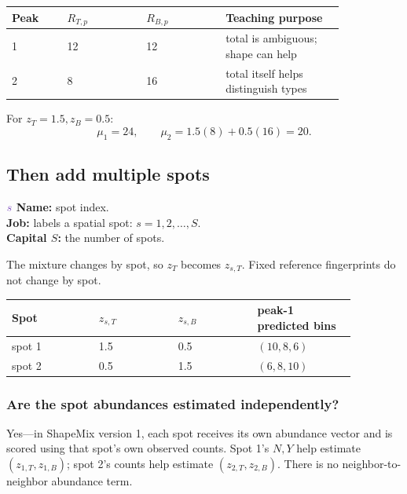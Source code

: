 \documentclass[11pt]{article}
\newcommand{\unknownq}[1]{\textcolor{unknownpurple}{#1}}
\begin{document}
\begin{center}
\begin{tabular}{C{0.14\linewidth}C{0.20\linewidth}C{0.20\linewidth}L{0.30\linewidth}}
\toprule
Peak & \(R_{T,p}\) & \(R_{B,p}\) & Teaching purpose \\
 & 12 & 12 & total is ambiguous; shape can help \\
2 & 8 & 16 & total itself helps distinguish types \\
\bottomrule
\end{tabular}
\end{center}

For \(z_T=1.5,z_B=0.5\):
\[
\mu_1=24,\qquad
\mu_2=1.5(8)+0.5(16)=20.
\]

\subsection{Then add multiple spots}

\begin{newvar}{\(\unknownq{s}\)}
\textbf{Name:} spot index.\\
\textbf{Job:} labels a spatial spot: \(s=1,2,\ldots,S\).\\
\textbf{Capital \(S\):} the number of spots.
\end{newvar}

The mixture changes by spot, so \(z_T\) becomes \(z_{s,T}\). Fixed reference
fingerprints do not change by spot.

\begin{center}
\begin{tabular}{L{0.22\linewidth}C{0.20\linewidth}C{0.20\linewidth}C{0.25\linewidth}}
\toprule
Spot & \(z_{s,T}\) & \(z_{s,B}\) & peak-1 predicted bins \\
\midrule
spot 1 & 1.5 & 0.5 & \((10,8,6)\) \\
spot 2 & 0.5 & 1.5 & \((6,8,10)\) \\
\bottomrule
\end{tabular}
\end{center}

\subsubsection*{Are the spot abundances estimated independently?}

Yes---in ShapeMix version 1, each spot receives its own abundance vector and is
scored using that spot's own observed counts.  Spot 1's \(N,Y\) help estimate
\((z_{1,T},z_{1,B})\); spot 2's counts help estimate
\((z_{2,T},z_{2,B})\).  There is no neighbor-to-neighbor abundance term.
\end{document}
